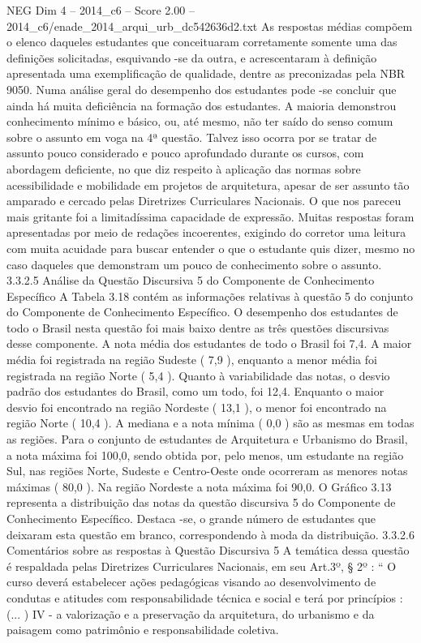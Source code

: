 \begin{textsample}{NEG Dim 4 – 2014\_c6 – Score 2.00 – 2014\_c6/enade\_2014\_arqui\_urb\_dc542636d2.txt}
As respostas médias compõem o elenco daqueles estudantes que conceituaram corretamente somente uma das definições solicitadas, esquivando -se da outra, e acrescentaram à definição apresentada uma exemplificação de qualidade, dentre as preconizadas pela NBR 9050.
Numa análise geral do desempenho dos estudantes pode -se concluir que ainda há muita deficiência na formação dos estudantes.
A maioria demonstrou conhecimento mínimo e básico, ou, até mesmo, não ter saído do senso comum sobre o assunto em voga na 4ª questão.
Talvez isso ocorra por se tratar de assunto pouco considerado e pouco aprofundado durante os cursos, com abordagem deficiente, no que diz respeito à aplicação das normas sobre acessibilidade e mobilidade em projetos de arquitetura, apesar de ser assunto tão amparado e cercado pelas Diretrizes Curriculares Nacionais.
O que nos pareceu mais gritante foi a limitadíssima capacidade de expressão.
Muitas respostas foram apresentadas por meio de redações incoerentes, exigindo do corretor uma leitura com muita acuidade para buscar entender o que o estudante quis dizer, mesmo no caso daqueles que demonstram um pouco de conhecimento sobre o assunto. 3.3.2.5 Análise da Questão Discursiva 5 do Componente de Conhecimento Específico A Tabela 3.18 contém as informações relativas à questão 5 do conjunto do Componente de Conhecimento Específico.
O desempenho dos estudantes de todo o Brasil nesta questão foi mais baixo dentre as três questões discursivas desse componente.
A nota média dos estudantes de todo o Brasil foi 7,4.
A maior média foi registrada na região Sudeste ( 7,9 ), enquanto a menor média foi registrada na região Norte ( 5,4 ).
Quanto à variabilidade das notas, o desvio padrão dos estudantes do Brasil, como um todo, foi 12,4.
Enquanto o maior desvio foi encontrado na região Nordeste ( 13,1 ), o menor foi encontrado na região Norte ( 10,4 ).
A mediana e a nota mínima ( 0,0 ) são as mesmas em todas as regiões.
Para o conjunto de estudantes de Arquitetura e Urbanismo do Brasil, a nota máxima foi 100,0, sendo obtida por, pelo menos, um estudante na região Sul, nas regiões Norte, Sudeste e Centro-Oeste onde ocorreram as menores notas máximas ( 80,0 ).
Na região Nordeste a nota máxima foi 90,0.
O Gráfico 3.13 representa a distribuição das notas da questão discursiva 5 do Componente de Conhecimento Específico.
Destaca -se, o grande número de estudantes que deixaram esta questão em branco, correspondendo à moda da distribuição. 3.3.2.6 Comentários sobre as respostas à Questão Discursiva 5 A temática dessa questão é respaldada pelas Diretrizes Curriculares Nacionais, em seu Art.3º, § 2º : “ O curso deverá estabelecer ações pedagógicas visando ao desenvolvimento de condutas e atitudes com responsabilidade técnica e social e terá por princípios : (... ) IV - a valorização e a preservação da arquitetura, do urbanismo e da paisagem como patrimônio e responsabilidade coletiva.

\end{textsample}
